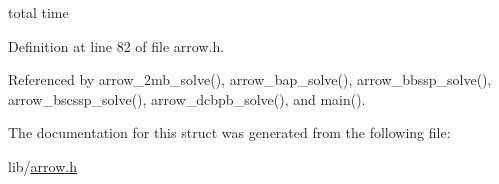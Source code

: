 total time 

Definition at line 82 of file arrow.h.

Referenced by arrow\_\-2mb\_\-solve(), arrow\_\-bap\_\-solve(), arrow\_\-bbssp\_\-solve(), arrow\_\-bscssp\_\-solve(), arrow\_\-dcbpb\_\-solve(), and main().

The documentation for this struct was generated from the following file:\begin{CompactItemize}
\item 
lib/\hyperlink{arrow_8h}{arrow.h}\end{CompactItemize}
